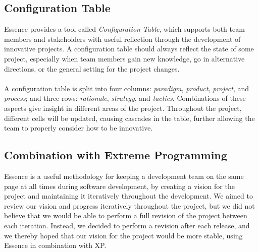 \subsection{Configuration Table}
Essence provides a tool called \emph{Configuration Table}\parencite{essence_book}, which supports both team members and stakeholders with useful reflection through the development of innovative projects. A configuration table should always reflect the state of some project, especially when team members gain new knowledge, go in alternative directions, or the general setting for the project changes.
\\\\
A configuration table is split into four columns: \emph{paradigm}, \emph{product}, \emph{project}, and \emph{process}; and three rows: \emph{rationale}, \emph{strategy}, and \emph{tactics}. Combinations of these aspects give insight in different areas of the project. Throughout the project, different cells will be updated, causing cascades in the table, further allowing the team to properly consider how to be innovative. 

\subsection{Combination with Extreme Programming}
\label{sub:combination_with_extreme_programming}
Essence is a useful methodology for keeping a development team on the same page at all times during software development, by creating a vision for the project and maintaining it iteratively throughout the development. We aimed to review our vision and progress iteratively throughout the project, but we did not believe that we would be able to perform a full revision of the project between each iteration. Instead, we decided to perform a revision after each release, and we thereby hoped that our vision for the project would be more stable, using Essence in combination with XP.